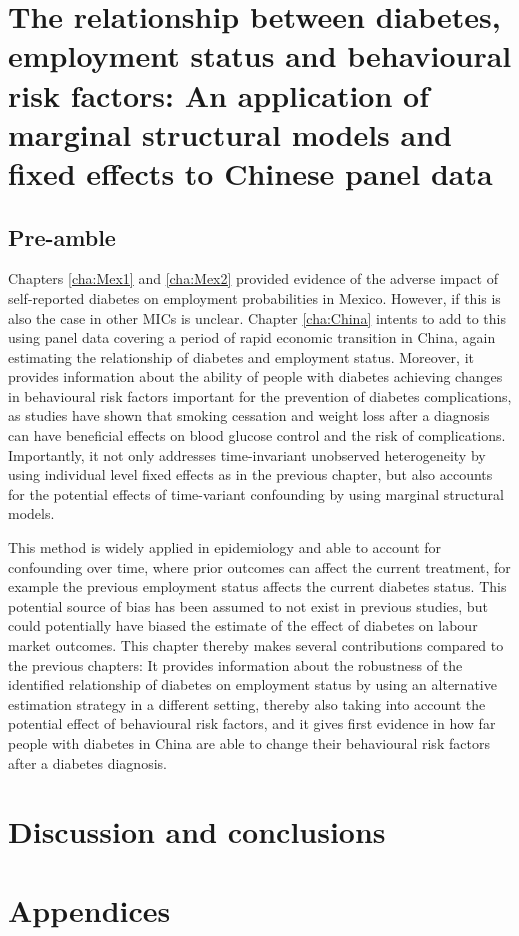 
\acresetall  %
\chapter{\label{cha:China} The relationship between diabetes, employment status and behavioural risk factors: An application of marginal structural models and fixed effects to Chinese panel data}
\section*{Pre-amble}

Chapters \ref{cha:Mex1} and \ref{cha:Mex2} provided evidence of the adverse impact of self-reported diabetes on employment probabilities in Mexico. However, if this is also the case in other \acp{MIC} is unclear. Chapter \ref{cha:China} intents to add to this using panel data covering a period of rapid economic transition in China, again estimating the relationship of diabetes and employment status. Moreover, it provides information about the ability of people with diabetes achieving changes in behavioural risk factors important for the prevention of diabetes complications, as studies have shown that smoking cessation and weight loss after a diagnosis can have beneficial effects on blood glucose control and the risk of complications. Importantly, it not only addresses time-invariant unobserved heterogeneity by using individual level fixed effects as in the previous chapter, but also accounts for the potential effects of time-variant confounding by using marginal structural models.

This method is widely applied in epidemiology and able to account for confounding over time, where prior outcomes can affect the current treatment, for example the previous employment status affects the current diabetes status. This potential source of bias has been assumed to not exist in previous studies, but could potentially have biased the estimate of the effect of diabetes on labour market outcomes. This chapter thereby makes several contributions compared to the previous chapters: It provides information about the robustness of the identified relationship of diabetes on employment status by using an alternative estimation strategy in a different setting, thereby also taking into account the potential effect of behavioural risk factors, and it gives first evidence in how far people with diabetes in China are able to change their behavioural risk factors after a diabetes diagnosis.



\acresetall  %
\chapter{\label{cha:Discussion}Discussion and conclusions} 
\acresetall  %

\chapter*{\label{cha:Appendix}Appendices}

\cleardoublepage

\printbibliography

          
